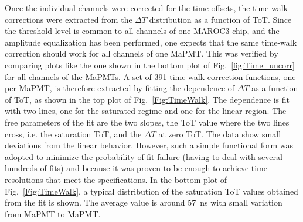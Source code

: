 \documentclass[5p,times,twocolumn]{elsarticle}
\begin{document}
Once the individual channels were corrected for the time offsets, the time-walk corrections were extracted from
the $\Delta T$ distribution as a function of ToT. Since the threshold level is common to all channels of one MAROC3
chip, and the amplitude equalization has been performed, one expects that the same time-walk correction should work
for all channels of one MaPMT. This was verified by comparing plots like the one shown in the bottom plot of
Fig.~\ref{fig:Time_uncorr} for all channels of the MaPMTs. A set of 391 time-walk correction functions, one
per MaPMT, is therefore extracted by fitting the dependence of $\Delta T$ as a function of ToT, as shown in the
top plot of Fig.~\ref{Fig:TimeWalk}. The dependence is fit with two lines, one for the saturated regime and
one for the linear region. The free parameters of the fit are the two slopes, the ToT value where the two lines cross,
i.e. the saturation ToT, and the $\Delta T$ at zero ToT. The data show small deviations from the linear behavior.
However, such a simple functional form was adopted to minimize the probability of fit failure (having to deal with
several hundreds of fits) and because it was proven to be enough to achieve time resolutions that meet the
specifications. In the bottom plot of Fig.~\ref{Fig:TimeWalk}, a typical distribution of the saturation ToT values
obtained from the fit is shown. The average value is around 57~ns with small variation from MaPMT to MaPMT.
\end{document}

